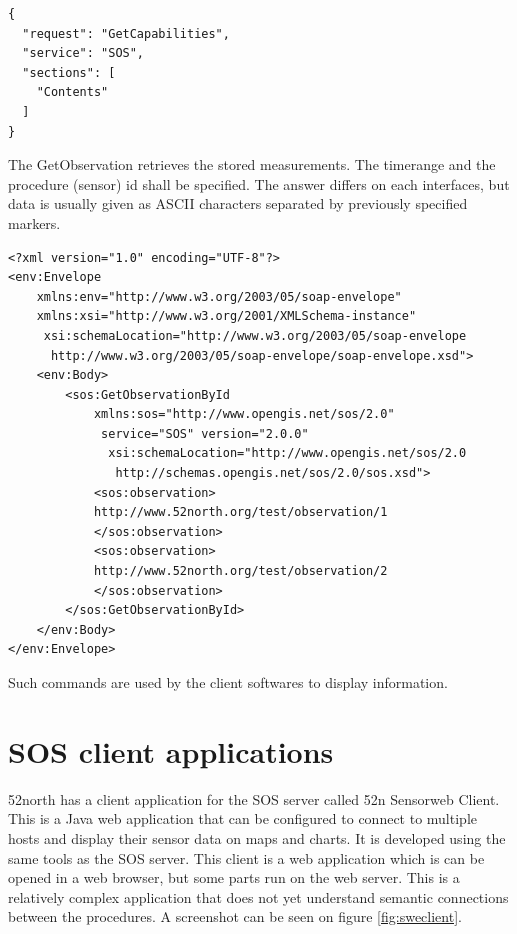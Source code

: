 \begin{lstlisting}[caption={JSON getCapabilities POST request\label{lst:getcap}}]
{
  "request": "GetCapabilities",
  "service": "SOS",
  "sections": [
    "Contents"
  ]
}
\end{lstlisting}

The GetObservation retrieves the stored measurements. The timerange and the procedure (sensor) id shall be specified. The answer differs on each interfaces, but data is usually given as ASCII characters separated by previously specified markers.

\begin{lstlisting}[caption={SOAP getObservationById POST request\label{lst:getobs}}]
<?xml version="1.0" encoding="UTF-8"?>
<env:Envelope
    xmlns:env="http://www.w3.org/2003/05/soap-envelope"
    xmlns:xsi="http://www.w3.org/2001/XMLSchema-instance"
     xsi:schemaLocation="http://www.w3.org/2003/05/soap-envelope
      http://www.w3.org/2003/05/soap-envelope/soap-envelope.xsd">
    <env:Body>
        <sos:GetObservationById
            xmlns:sos="http://www.opengis.net/sos/2.0"
             service="SOS" version="2.0.0"
              xsi:schemaLocation="http://www.opengis.net/sos/2.0
               http://schemas.opengis.net/sos/2.0/sos.xsd">
            <sos:observation>
            http://www.52north.org/test/observation/1
            </sos:observation>
            <sos:observation>
            http://www.52north.org/test/observation/2
            </sos:observation>
        </sos:GetObservationById>
    </env:Body>
</env:Envelope>
\end{lstlisting}
Such commands are used by the client softwares to display information.

\section{SOS client applications}

52north has a client application for the SOS server called 52n Sensorweb Client. This is a Java web application that can be configured to connect to multiple hosts and display their sensor data on maps and charts. It is developed using the same tools as the SOS server. This client is a web application which is can be opened in a web browser, but some parts run on the web server. This is a relatively complex application that does not yet understand semantic connections between the procedures. A screenshot can be seen on figure \ref{fig:sweclient}.

